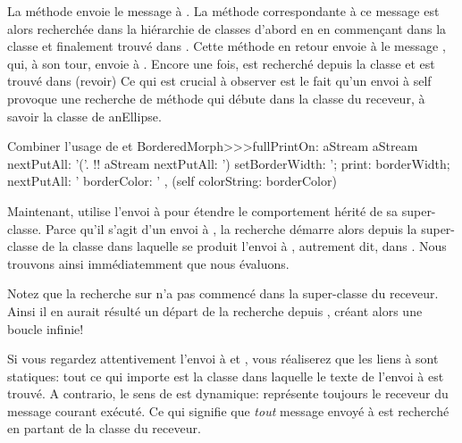 \documentclass[a4paper,10pt,twoside]{book}
\begin{document}
La méthode  envoie le message
 à \self. La méthode correspondante à ce
message est alors recherchée dans la hiérarchie de classes d'abord en
en commençant dans la classe  et finalement trouvé dans .
Cette méthode en retour envoie à \self le message
, qui, à son tour, envoie
 à \self. Encore une fois,  est recherché
depuis la classe  et  
est trouvé dans  
(revoir) %
Ce qui est crucial à observer est le fait qu'un envoi à self provoque une recherche de méthode
qui débute dans la classe du receveur, à savoir la classe de anEllipse.


\begin{method}[fullPrintOn]{Combiner l'usage de \super et \self}
BorderedMorph>>>fullPrintOn: aStream
	aStream nextPutAll: '('.
	!!
	aStream nextPutAll: ') setBorderWidth: '; print: borderWidth;
		nextPutAll: ' borderColor: ' , (self colorString: borderColor)
\end{method}
Maintenant,  utilise l'envoi à \super pour étendre le comportement  hérité de sa super-classe.
Parce qu'il s'agit d'un envoi à \super, la recherche démarre alors
depuis la super-classe de la classe dans laquelle se produit l'envoi à
\super, autrement dit, dans 
.
Nous trouvons ainsi immédiatemment  que nous évaluons.

Notez que la recherche sur \super n'a pas commencé dans la 
super-classe du receveur. Ainsi il en aurait résulté
un départ de la recherche depuis , 
créant alors une boucle infinie!


Si vous regardez attentivement l'envoi à \super et , vous réaliserez que les liens à \super sont statiques: tout ce qui importe
est la classe dans laquelle le texte de l'envoi à \super est trouvé.
A contrario, le sens de \self est dynamique: \self représente toujours le
receveur du message courant exécuté. Ce qui signifie que  \emph{tout} message envoyé à \self est recherché en partant de la classe du receveur.
\end{document}

